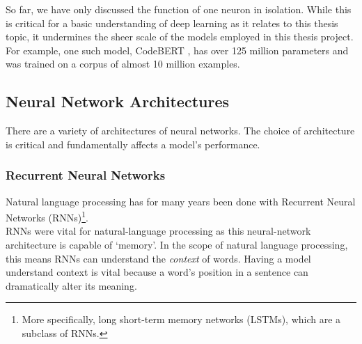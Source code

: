 %
%

\noindent
So far, we have only discussed the function of one neuron in isolation. While this is critical for a basic understanding of deep learning as it relates to this thesis topic, it undermines the sheer scale of the models employed in this thesis project. For example, one such model, CodeBERT \cite{CodeBERT}, has over 125 million parameters and was trained on a corpus of almost 10 million examples.

\subsection{Neural Network Architectures}
There are a variety of architectures of neural networks. The choice of architecture is critical and fundamentally affects a model's performance.

\subsubsection{Recurrent Neural Networks}

\noindent
Natural language processing has for many years been done with Recurrent Neural Networks (RNNs)\footnote{More specifically, long short-term memory networks (LSTMs), which are a subclass of RNNs.}. \\

\noindent
RNNs were vital for natural-language processing as this neural-network architecture is capable of `memory'. In the scope of natural language processing, this means RNNs can understand the \emph{context} of words. Having a model understand context is vital because a word's position in a sentence can dramatically alter its meaning. \\

